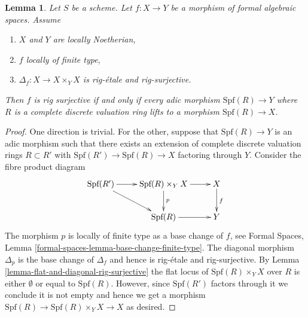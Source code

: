 \documentclass[10pt,a4paper]{amsart}
\theoremstyle{plain}
\newtheorem{lemma}[subsection]{Lemma}
\theoremstyle{definition}
\theoremstyle{remark}
\numberwithin{equation}{subsection}
\begin{document}
\begin{lemma}
\label{lemma-rig-monomorphism-rig-surjective}
Let $S$ be a scheme. Let $f : X \to Y$ be a morphism of formal algebraic
spaces. Assume
\begin{enumerate}
\item $X$ and $Y$ are locally Noetherian,
\item $f$ locally of finite type,
\item $\Delta_f : X \to X \times_Y X$ is rig-\'etale and rig-surjective.
\end{enumerate}
Then $f$ is rig surjective if and only if every adic morphism
$\text{Spf}(R) \to Y$ where $R$ is a complete discrete
valuation ring lifts to a morphism $\text{Spf}(R) \to X$.
\end{lemma}

\begin{proof}
One direction is trivial. For the other, suppose that $\text{Spf}(R) \to Y$
is an adic morphism such that there exists an extension of complete
discrete valuation rings $R \subset R'$ with
$\text{Spf}(R') \to \text{Spf}(R) \to X$ factoring through $Y$.
Consider the fibre product diagram
$$
\xymatrix{
\text{Spf}(R') \ar[r] \ar[rd] &
\text{Spf}(R) \times_Y X \ar[r] \ar[d]^p &
X \ar[d]^f \\
&
\text{Spf}(R) \ar[r] &
Y
}
$$
The morphism $p$ is locally of finite type as a base change of $f$, see
Formal Spaces, Lemma
\ref{formal-spaces-lemma-base-change-finite-type}.
The diagonal morphism $\Delta_p$ is the base change of
$\Delta_f$ and hence is rig-\'etale and rig-surjective.
By Lemma \ref{lemma-flat-and-diagonal-rig-surjective}
the flat locus of $\text{Spf}(R) \times_Y X$ over $R$
is either $\emptyset$ or equal to $\text{Spf}(R)$.
However, since $\text{Spf}(R')$ factors through it
we conclude it is not empty and hence
we get a morphism $\text{Spf}(R) \to \text{Spf}(R) \times_Y X \to X$
as desired.
\end{proof}
\end{document}
